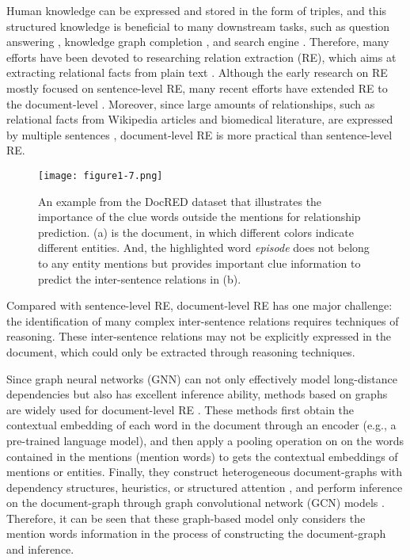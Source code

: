 \documentclass[sigconf,natbib=true]{acmart}
\begin{document}
Human knowledge can be expressed and stored in the form of triples, and this structured knowledge is beneficial to many downstream tasks, such as question answering \cite{c:102}, knowledge graph completion \cite{c:101}, and search engine \cite{c:103}. Therefore, many efforts have been devoted to researching relation extraction (RE), which aims at extracting relational facts from plain text \cite{c:104}.
Although the early research on RE mostly focused on sentence-level RE, many recent efforts have extended RE to the document-level \cite{c:105,c:106}.
Moreover, since large amounts of relationships, such as relational facts from Wikipedia articles and biomedical literature, are expressed by multiple sentences  \cite{c:105,c:107}, document-level RE is more practical than sentence-level RE.

\begin{figure}[t]
\centering
\texttt{[image: figure1-7.png]} %
\caption{An example from the DocRED dataset that illustrates the importance of the clue words outside the mentions for relationship prediction. (a) is the document, in which different colors indicate different entities. And, the highlighted word \textit{episode} does not belong to any entity mentions but provides important clue information to predict the inter-sentence relations in (b).}
\label{fig1}
\end{figure}


Compared with sentence-level RE, document-level RE has one major challenge: the identification of many complex inter-sentence relations requires techniques of reasoning.
These inter-sentence relations may not be explicitly expressed in the document, which could only be extracted through reasoning techniques. 

Since graph neural networks (GNN) can not only effectively model long-distance dependencies but also has excellent inference ability, methods based on graphs are widely used for document-level RE \cite{c:129,c:130,c:133,c:131}.
These methods first obtain the contextual embedding of each word in the document through an encoder (e.g., a pre-trained language model), and then apply a pooling operation on on the words contained in the mentions (mention words) to gets the contextual embeddings of mentions or entities.
Finally, they construct heterogeneous document-graphs with dependency structures, heuristics, or structured attention \cite{c:108,c:109,c:110}, and perform inference on the document-graph through graph convolutional network (GCN) models \cite{c:112,c:113}.
Therefore, it can be seen that these graph-based model only considers the mention words information in the process of constructing the document-graph and inference.
\end{document}
